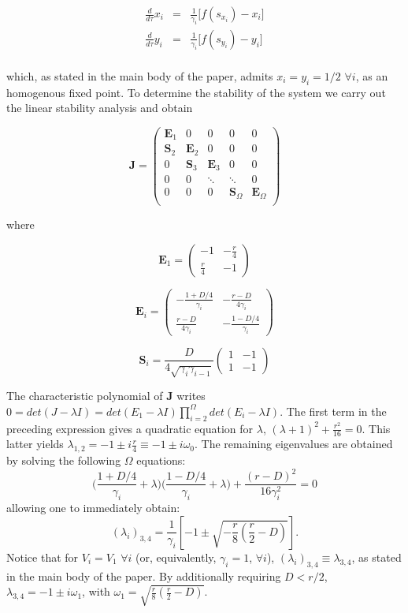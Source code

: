 \documentclass[showpacs,prl,superscriptaddress,nofootinbib, twocolumn]{revtex4}
\begin{document}
\begin{eqnarray*}
\frac{d}{d\tau}{x}_i&=&\frac{1}{\gamma_i}\big[f(s_{x_i})-{x}_i  \big] \\
\frac{d}{d\tau}{y}_i&=&\frac{1}{\gamma_i}\big[f(s_{y_i})-{y}_i  \big]\\ 
\end{eqnarray*}

which, as stated in the main body of the paper, admits $x_i =y_i = 1/2$ $\forall i$, as an homogenous fixed point. To determine the stability of the system we carry out the linear stability analysis and obtain 

\begin{equation}
{\boldsymbol J}=
\begin{pmatrix}
{\boldsymbol E_1}  & 0& 0 & 0 & 0  \\
{\boldsymbol S_2} & {\boldsymbol E_2} & 0& 0 & 0  \\
0 & {\boldsymbol S_3} & {\boldsymbol E_3} & 0 & 0   \\
0 & 0 & \ddots & \ddots & 0 \\
0 & 0 & 0 & {\boldsymbol S_\Omega} &  {\boldsymbol E_\Omega} \\
\end{pmatrix}
\end{equation}

where

\[
{\boldsymbol E_1} =
\begin{pmatrix}
-1 & -\frac{r}{4} \\
\frac{r}{4} & -1 
\end{pmatrix}
\]


\[
{\boldsymbol E_i} =
\begin{pmatrix}
-\frac{1+D/4}{\gamma_i} & -\frac{r-D}{4\gamma_i} \\
\frac{r-D}{4\gamma_i} & -\frac{1-D/4}{\gamma_i} 
\end{pmatrix}
\]

\[
{\boldsymbol S_i} =\frac{D}{4\sqrt{\gamma_i\gamma_{i-1}}}
\begin{pmatrix}
1& -1 \\
1& -1 
\end{pmatrix}
\]

The characteristic polynomial of ${\boldsymbol J}$ writes 
$0=det(J-\lambda I)=det({E_1}-\lambda I)\prod_{i=2}^{\Omega} det(E_i-\lambda I)$. 
The first term in the preceding expression gives a quadratic equation for $\lambda$, 
$(\lambda+1)^2+\frac{r^2}{16}=0$. This latter yields $\lambda_{1,2}=-1\pm i\frac{r}{4}\equiv-1\pm i\omega_0$. 
The remaining eigenvalues are obtained by solving the following $\Omega$ equations:
$$\big( \frac{1+D/4}{\gamma_i}+\lambda \big)\big( \frac{1-D/4}{\gamma_i}+\lambda \big)+\frac{(r-D)^2}{16\gamma_i^2}=0$$
allowing one to immediately obtain: 
$$(\lambda_i)_{3,4}=\frac{1}{\gamma_i}\left[-1\pm \sqrt{-\frac{r}{8}(\frac{r}{2}-D)}\right].$$ 
Notice that for $V_i=V_1$ $\forall i$ (or, equivalently, $\gamma_i=1$, $\forall i$), $(\lambda_i)_{3,4} \equiv \lambda_{3,4}$, 
as stated in the main body of the paper. By additionally requiring $D<r/2$, $\lambda_{3,4}=-1 \pm i \omega_1$, with 
$\omega_1=\sqrt{\frac{r}{8}\left( \frac{r}{2}-D \right) }$.
\end{document}
